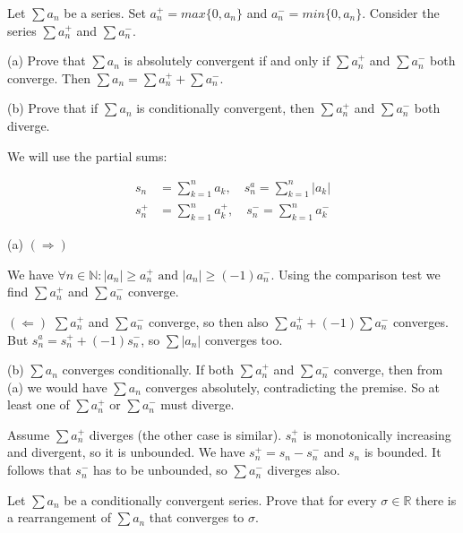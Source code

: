 \begin{tcolorbox}[title={Exercise 3.23, page 36}]
Let $\sum a_n$ be a series. Set $a^+_n = max\{0, a_n\}$ and $a^-_n = min\{0, a_n\}$. Consider the series $\sum a^+_n$ and $\sum a^-_n$.

(a) Prove that $\sum a_n$ is absolutely convergent if and only if $\sum a^+_n$ and $\sum a^-_n$ both converge. Then $\sum a_n = \sum a^+_n + \sum a^-_n$.

(b) Prove that if $\sum a_n$ is conditionally convergent, then $\sum a^+_n$ and $\sum a^-_n$ both diverge. 
\end{tcolorbox}

\begin{solution}
We will use the partial sums:

\begin{align*}
s_n &= \sum_{k = 1}^n a_k, \quad s^a_n = \sum_{k = 1}^n |a_k| \\
s^+_n &= \sum_{k = 1}^n a^+_k, \quad s^-_n = \sum_{k = 1}^n a^-_k
\end{align*}

(a) $(\Rightarrow)$ 

We have $\forall n \in \mathbb{N}: |a_n| \geq a^+_n \text{ and } |a_n| \geq (-1) a^-_n$. Using the comparison test we find $\sum a^+_n$ and $\sum a^-_n$ converge.

$(\Leftarrow)$ $\sum a^+_n$ and $\sum a^-_n$ converge, so then also $\sum a^+_n + (-1) \sum a^-_n$ converges. But $s^a_n = s^+_n + (-1)s^-_n$, so $\sum |a_n|$ converges too.

(b) $\sum a_n$ converges conditionally. If both $\sum a^+_n$ and $\sum a^-_n$ converge, then from (a) we would have $\sum a_n$ converges absolutely, contradicting the premise. So at least one of $\sum a^+_n$ or $\sum a^-_n$ must diverge. 

Assume $\sum a^+_n$ diverges (the other case is similar). $s^+_n$ is monotonically increasing and divergent, so it is unbounded. We have $s^+_n = s_n - s^-_n$ and $s_n$ is bounded. It follows that $s^-_n$ has to be unbounded, so $\sum a^-_n$ diverges also.

\end{solution}

\begin{tcolorbox}[title={Exercise 3.24, page 36}]
Let $\sum a_n$ be a conditionally convergent series. Prove that for every $\sigma \in \mathbb{R}$ there is a rearrangement of $\sum a_n$ that converges to $\sigma$.
\end{tcolorbox}

